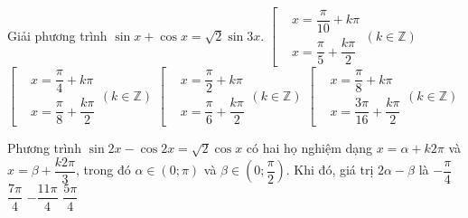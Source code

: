 \begin{ex}%
	Giải phương trình $\sin x+\cos x=\sqrt{2}\sin 3x$.
	\choice
	{$\left[
		\begin{aligned}&x=\dfrac{\pi}{10}+k\pi\\&x=\dfrac{\pi}{5}+\dfrac{k\pi}{2}\end{aligned}\right. (k\in\mathbb{Z})$}
	{$\left[
		\begin{aligned}&x=\dfrac{\pi}{4}+k\pi\\&x=\dfrac{\pi}{8}+\dfrac{k\pi}{2}\end{aligned}\right. (k\in\mathbb{Z})$}
	{$\left[
		\begin{aligned}&x=\dfrac{\pi}{2}+k\pi\\&x=\dfrac{\pi}{6}+\dfrac{k\pi}{2}\end{aligned}\right. (k\in\mathbb{Z})$}
	{\True $\left[
		\begin{aligned}&x=\dfrac{\pi}{8}+k\pi\\&x=\dfrac{3\pi}{16}+\dfrac{k\pi}{2}\end{aligned}\right. (k\in\mathbb{Z})$}
	\loigiai{
		Ta có $\sin x+\cos x=\sqrt{2}\sin 3x\Leftrightarrow \sin\left(x+\dfrac{\pi}{4}\right)=\sin 3x\Leftrightarrow \left[
		\begin{aligned}&x=\dfrac{\pi}{8}+k\pi\\&x=\dfrac{3\pi}{16}+\dfrac{k\pi}{2}\end{aligned}\right. (k\in\mathbb{Z})$.
	}
\end{ex}

\begin{ex}%
	Phương trình $\sin  2x-\cos 2x=\sqrt{2}\cos x$ có hai họ nghiệm dạng $x=\alpha +k2\pi$ và $x=\beta +\dfrac{k2\pi}{3}$, trong đó $\alpha \in \left(0;\pi\right)$ và $\beta \in \left(0;\dfrac{\pi}{2}\right)$. Khi đó, giá trị $2\alpha -\beta$ là
	\choice
	{$-\dfrac{\pi}{4}$}
	{$\dfrac{7\pi}{4}$}
	{$-\dfrac{11\pi}{4}$}
	{\True $\dfrac{5\pi}{4}$}
\end{ex}


